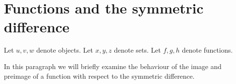 \documentclass[../../set-theory.ftl.tex]{subfiles}
\begin{document}
  \section{Functions and the symmetric difference}

  \begin{forthel}
  \end{forthel}

  \begin{forthel}
  \end{forthel}

  \begin{forthel}
    Let $u,v,w$ denote objects.
    Let $x,y,z$ denote sets.
    Let $f,g,h$ denote functions.
  \end{forthel}

  \noindent In this paragraph we will briefly examine the behaviour of the
  image and preimage of a function with respect to the symmetric difference.
\end{document}
